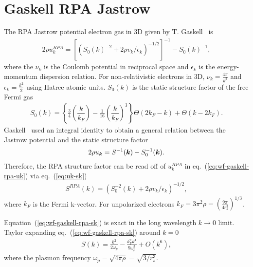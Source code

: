 \section{Gaskell RPA Jastrow}
\label{sec:gaskell-rpa-jas}
The RPA Jastrow potential electron gas in 3D given by T. Gaskell~\cite{Gaskell1961, Ceperley1978, Holzmann2009, Holzmann2016} is
\begin{align}
2\rho u^{RPA}_k = \left[\left( S_0(k)^{-2} + 2\rho v_k/\epsilon_k \right)^{-1/2} \right] ^{-1} - S_0(k)^{-1}, \label{eq:wf-gaskell-rpa-uk}
\end{align}
where the $\nu_k$ is the Coulomb potential in reciprocal space and $\epsilon_k$ is the energy-momentum dispersion relation. For non-relativistic electrons in 3D, $\nu_k=\frac{4\pi}{k^2}$ and $\epsilon_k=\frac{k^2}{2}$ using Hatree atomic units. $S_0(k)$ is the static structure factor of the free Fermi gas ~\cite{Gori-Giorgi2000}
\begin{align}
S_0(k) = \left\{
\frac{3}{4}\left( \dfrac{k}{k_F} \right) - \frac{1}{16}\left(\dfrac{k}{k_F}\right)^3\right\} \Theta(2k_F-k) + \Theta(k-2k_F).
\end{align}
Gaskell~\cite{Gaskell1961} used an integral identity to obtain a general relation between the Jastrow potential and the static structure factor%
\begin{align}
2\rho u_{\boldsymbol{k}} = S^{-1}(\boldsymbol{k}) - S^{-1}_0(\boldsymbol{k}). \label{eq:uk-sk}
\end{align}
Therefore, the RPA structure factor can be read off of $u^{RPA}_k$ in eq.~(\ref{eq:wf-gaskell-rpa-uk}) via eq.~(\ref{eq:uk-sk})
\begin{align}
S^{RPA}(k) = \left( S_0^{-2}(k) + 2\rho v_k/\epsilon_k \right)^{-1/2}, \label{eq:wf-gaskell-rpa-sk}
\end{align}
where $k_F$ is the Fermi k-vector. For unpolarized electrons $k_F=3\pi^2\rho=\left(\frac{9\pi}{4r_s^3}\right)^{1/3}$.

Equation~(\ref{eq:wf-gaskell-rpa-sk}) is exact in the long wavelength $k\rightarrow0$ limit. Taylor expanding eq.~(\ref{eq:wf-gaskell-rpa-sk}) around $k=0$
\begin{align} \label{eq:wf-gaskell-rpa-sk-taylor}
S(k) = \frac{k^2}{2\omega_p}-\frac{k_F^2k^4}{9 \omega_p ^3}+O\left(k^6\right),
\end{align}
where the plasmon frequency $\omega_p=\sqrt{4\pi\rho}=\sqrt{3/r_s^3}$.

